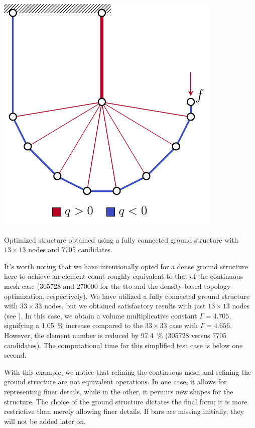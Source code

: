     \begin{marginfigure}
        \centering
        \includegraphics[width=0.8\linewidth]{figures/03_comparison_TO_TTO/12_tto_sol_13/L_tto_opt.pdf}
        \caption{Optimized structure obtained using a fully connected ground structure with $13 \times 13$ nodes and \num[group-separator={$\,$}]{7705} candidates.}
        \label{fig:03_L_tto_13}
    \end{marginfigure}
It's worth noting that we have intentionally opted for a dense ground structure here to achieve an element count roughly equivalent to that of the continuous mesh case (\num[group-separator={$\,$}]{305728} and \num[group-separator={$\,$}]{270000} for the \gls{tto} and the density-based topology optimization, respectively). We have utilized a fully connected ground structure with $33 \times 33$ nodes, but we obtained satisfactory results with just $13 \times 13$ nodes (see ). In this case, we obtain a volume multiplicative constant $\Gamma=4.705$, signifying a \qty{1.05}{\percent} increase compared to the $33 \times 33$ case with $\Gamma=4.656$. However, the element number is reduced by \qty{97.4}{\percent} (\num[group-separator={$\,$}]{305728} versus \num[group-separator={$\,$}]{7705} candidates). The computational time for this simplified test case is below one second.

With this example, we notice that refining the continuous mesh and refining the ground structure are not equivalent operations. In one case, it allows for representing finer details, while in the other, it permits new shapes for the structure. The choice of the ground structure dictates the final form; it is more restrictive than merely allowing finer details. If bars are missing initially, they will not be added later on.

